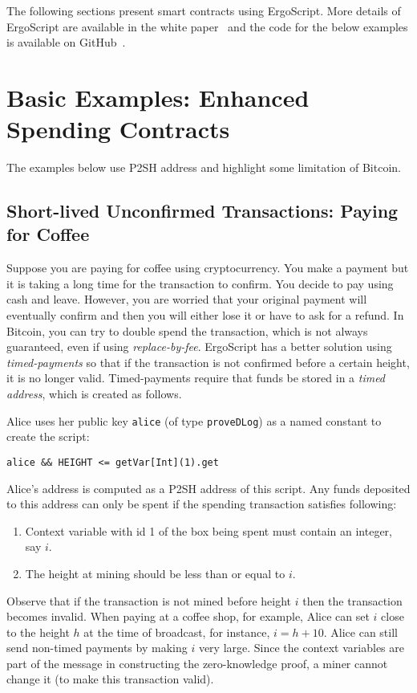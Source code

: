 \documentclass[11pt]{article}
\newcommand{\langname}{ErgoScript\xspace}
\begin{document}
The following sections present smart contracts using \langname. More details of \langname are available in the white paper~\cite{whitepaper} and the code for the below examples is available on GitHub~\cite{langrepo}. 
\section{Basic Examples: Enhanced Spending Contracts}

The examples below use P2SH address and highlight some limitation of Bitcoin. 

\subsection{Short-lived Unconfirmed Transactions: Paying for Coffee}

Suppose you are paying for coffee using cryptocurrency. You make a payment but it is taking a long time for the transaction to confirm. You decide to pay using cash and leave. However, you are worried that your original payment will eventually confirm and then you will either lose it or have to ask for a refund. In Bitcoin, you can try to double spend the transaction, which is not always guaranteed, even if using {\em replace-by-fee}. \langname has a better solution using {\em timed-payments} so that if the transaction is not confirmed before a certain height, it is no longer valid. Timed-payments require that funds be stored in a {\em timed address}, which is created as follows. 

Alice uses her public key \texttt{alice} (of type \texttt{proveDLog}) as a named constant to create the script:
\begin{verbatim}
alice && HEIGHT <= getVar[Int](1).get
\end{verbatim}

Alice's address is computed as a P2SH address of this script. Any funds deposited to this address can only be spent if the spending transaction satisfies following:
\begin{enumerate}
	\item Context variable with id 1 of the box being spent must contain an integer, say $i$.
	\item The height at mining should be less than or equal to $i$. 
\end{enumerate}

Observe that if the transaction is not mined before height $i$ then the transaction becomes invalid. When paying at a coffee shop, for example, Alice can set $i$ close to the height $h$ at the time of broadcast, for instance, $i = h + 10$. 
Alice can still send non-timed payments by making $i$ very large. Since the context variables are part of the message in constructing the zero-knowledge proof, a miner cannot change it (to make this transaction valid). 
\end{document}
